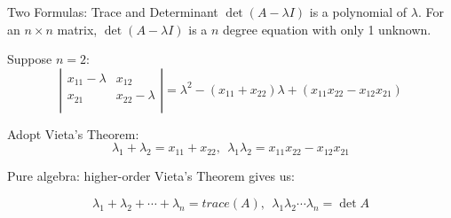 \documentclass{beamer}
\begin{document}
        \begin{frame}{Two Formulas: Trace and Determinant}
        $\det(A-\lambda I)$ is a polynomial of $\lambda$. For an $n\times n$ matrix, $\det(A-\lambda I)$ is a $n$ degree equation with only 1 unknown.
        
        \vspace{3pt}
        Suppose $n=2$:
        \begin{equation*}
            \left| \begin{matrix}
                x_{11}-\lambda&		x_{12}\\
                x_{21}&		x_{22}-\lambda\\
            \end{matrix} \right|=\lambda ^2-\left( x_{11}+x_{22} \right) \lambda +\left( x_{11}x_{22}-x_{12}x_{21} \right)
        \end{equation*}
        
        Adopt Vieta's Theorem:
        \begin{equation*}
            \lambda _1+\lambda _2=x_{11}+x_{22},\:\: \lambda _1\lambda _2=x_{11}x_{22}-x_{12}x_{21}
        \end{equation*}
        
        \vspace{3pt}
        Pure algebra: higher-order Vieta's Theorem gives us:
        
        \begin{equation*}
            \lambda _1+\lambda _2+\cdots +\lambda _n=trace\left( A \right) ,\:\: \lambda _1\lambda _2\cdots \lambda _n=\det A
        \end{equation*}
        \end{frame}
        
\end{document}
